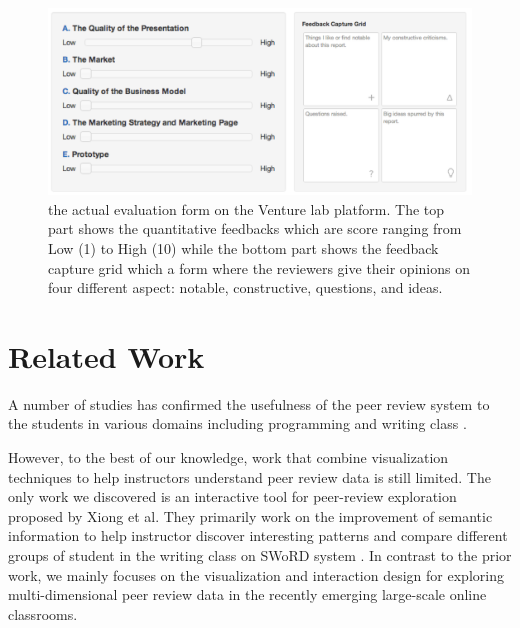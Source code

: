 \documentclass{sigchi}
\begin{document}
\begin{figure}[!t]
\centering
\includegraphics[width=\columnwidth]{images/review-form}
\caption{the actual evaluation form on the Venture lab platform.
The top part shows the quantitative feedbacks which are score ranging
from Low (1) to High (10) while the bottom part shows the feedback capture grid
which a form where the reviewers give their opinions
on four different aspect: notable, constructive, questions, and ideas.}
\label{fig:review-form}
\end{figure}


\section{Related Work}

A number of studies has confirmed the usefulness of the peer review system
to the students in various domains including programming and writing class
\cite{MyPeerReview,WebBasedPeerReview}.

However, to the best of our knowledge, work that combine visualization
techniques to help instructors understand peer review data is still limited.
The only work we discovered is  an interactive tool for peer-review
exploration proposed by Xiong et al. \cite{xiong} They primarily work on the
improvement of semantic information to help instructor discover interesting
patterns and compare different groups of student in the writing class on SWoRD
system \cite{Cho2007}. In contrast to the prior work, we mainly focuses on the
visualization and interaction design for exploring multi-dimensional peer
review data in the recently emerging large-scale online classrooms.
\end{document}
